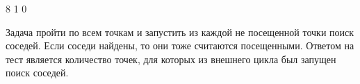 \begin{myverbbox}[\small]{\voutput}
8 1 0 
\end{myverbbox}

\solutionSection

Задача пройти по всем точкам и запустить из каждой не посещенной точки поиск соседей. Если соседи найдены, то они тоже считаются посещенными. Ответом на тест является количество точек, для которых из внешнего цикла был запущен поиск соседей.

